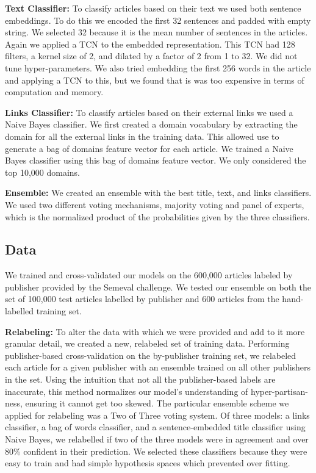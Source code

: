 \documentclass[11pt,a4paper]{article}
\begin{document}
\textbf{Text Classifier:}  To classify articles based on their text we used both sentence embeddings. To do this we encoded the first 32 sentences and padded with empty string. We selected 32 because it is the mean number of sentences in the articles. Again we applied a TCN to the embedded representation. This TCN had 128 filters, a kernel size of 2, and dilated by a factor of 2 from 1 to 32. We did not tune hyper-parameters. We also tried embedding the first 256 words in the article and applying a TCN to this, but we found that is was too expensive in terms of computation and memory.

\textbf{Links Classifier:} To classify articles based on their external links we used a Naive Bayes classifier. We first created a domain vocabulary by extracting the domain for all the external links in the training data. This allowed use to generate a bag of domains feature vector for each article. We trained a Naive Bayes classifier using this bag of domains feature vector. We only considered the top 10,000 domains.

\textbf{Ensemble:} We created an ensemble with the best title, text, and links classifiers. We used two different voting mechanisms, majority voting and panel of experts, which is the normalized product of the probabilities given by the three classifiers.

\subsection{Data}

We trained and cross-validated our models on the 600,000 articles labeled by publisher provided by the Semeval challenge. We tested our ensemble on both the set of 100,000 test articles labelled by publisher and 600 articles from the hand-labelled training set.

\textbf{Relabeling:}
To alter the data with which we were provided and add to it more granular detail, we created a new, relabeled set of training data. Performing publisher-based cross-validation on the by-publisher training set, we relabeled each article for a given publisher with an ensemble trained on all other publishers in the set. Using the intuition that not all the publisher-based labels are inaccurate, this method normalizes our model's understanding of hyper-partisan-ness, ensuring it cannot get too skewed. The particular ensemble scheme we applied for relabeling was a Two of Three voting system. Of three models: a links classifier, a bag of words classifier, and a sentence-embedded title classifier using Naive Bayes, we relabelled if two of the three models were in agreement and over 80\% confident in their prediction. We selected these classifiers because they were easy to train and had simple hypothesis spaces which prevented over fitting.
\end{document}

